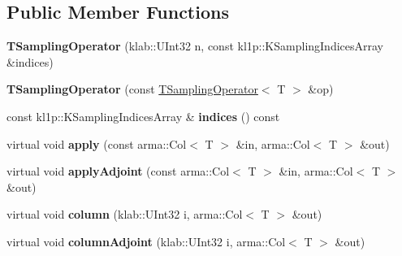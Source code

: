 \subsection*{Public Member Functions}
\begin{DoxyCompactItemize}
\item 
{\bfseries T\+Sampling\+Operator} (klab\+::\+U\+Int32 n, const kl1p\+::\+K\+Sampling\+Indices\+Array \&indices)\hypertarget{classkl1p_1_1TSamplingOperator_aa2eae2218e6de735a296696a54f1f4fa}{}\label{classkl1p_1_1TSamplingOperator_aa2eae2218e6de735a296696a54f1f4fa}

\item 
{\bfseries T\+Sampling\+Operator} (const \hyperlink{classkl1p_1_1TSamplingOperator}{T\+Sampling\+Operator}$<$ T $>$ \&op)\hypertarget{classkl1p_1_1TSamplingOperator_a23a929c23dcd8f825aca936c70f9daf0}{}\label{classkl1p_1_1TSamplingOperator_a23a929c23dcd8f825aca936c70f9daf0}

\item 
const kl1p\+::\+K\+Sampling\+Indices\+Array \& {\bfseries indices} () const \hypertarget{classkl1p_1_1TSamplingOperator_a545a86290467cae3f6c67fa0f65aaf96}{}\label{classkl1p_1_1TSamplingOperator_a545a86290467cae3f6c67fa0f65aaf96}

\item 
virtual void {\bfseries apply} (const arma\+::\+Col$<$ T $>$ \&in, arma\+::\+Col$<$ T $>$ \&out)\hypertarget{classkl1p_1_1TSamplingOperator_a931aa701662c30142d8a9228dca6c629}{}\label{classkl1p_1_1TSamplingOperator_a931aa701662c30142d8a9228dca6c629}

\item 
virtual void {\bfseries apply\+Adjoint} (const arma\+::\+Col$<$ T $>$ \&in, arma\+::\+Col$<$ T $>$ \&out)\hypertarget{classkl1p_1_1TSamplingOperator_aacbcb68619539856e84d6e1a40d5008a}{}\label{classkl1p_1_1TSamplingOperator_aacbcb68619539856e84d6e1a40d5008a}

\item 
virtual void {\bfseries column} (klab\+::\+U\+Int32 i, arma\+::\+Col$<$ T $>$ \&out)\hypertarget{classkl1p_1_1TSamplingOperator_a3ffe25b458b24a9db71ed467cbb39b1d}{}\label{classkl1p_1_1TSamplingOperator_a3ffe25b458b24a9db71ed467cbb39b1d}

\item 
virtual void {\bfseries column\+Adjoint} (klab\+::\+U\+Int32 i, arma\+::\+Col$<$ T $>$ \&out)\hypertarget{classkl1p_1_1TSamplingOperator_a81a0ace93a96752bf26ebefb0f3744de}{}\label{classkl1p_1_1TSamplingOperator_a81a0ace93a96752bf26ebefb0f3744de}

\end{DoxyCompactItemize}
